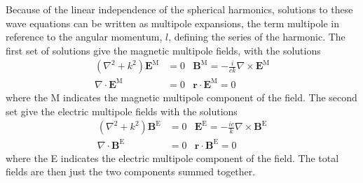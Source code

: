 Because of the linear independence of the spherical harmonics, solutions to these wave equations can be written as multipole expansions, the term multipole in reference to the angular momentum, $l$, defining the series of the harmonic. The first set of solutions give the magnetic multipole fields, with the solutions
\begin{subequations}
\label{eq:magnetic_sol}
\begin{align}
    \left(\nabla^2+k^2\right)\textbf{E}^\text{M} & = 0 & \textbf{B}^\text{M}=-\frac{i}{ck} \nabla \times \textbf{E}^\text{M} \\
    \nabla \cdot \textbf{E}^\text{M} & = 0 & \textbf{r}\cdot\textbf{E}^\text{M}=0
\end{align}
\end{subequations}
where the M indicates the magnetic multipole component of the field. The second set give the electric multipole fields with the solutions
\begin{subequations}
\label{eq:electric_sol}
\begin{align}
    \left(\nabla^2+k^2\right)\textbf{B}^\text{E} & = 0 & \textbf{E}^\text{E}=-\frac{ic}{k} \nabla \times \textbf{B}^\text{E} \\
    \nabla \cdot \textbf{B}^\text{E} & = 0 & \textbf{r}\cdot\textbf{B}^\text{E}=0
\end{align}
\end{subequations}
where the E indicates the electric multipole component of the field. The total fields are then just the two components summed together.

